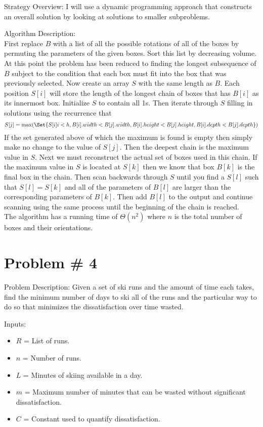 \documentclass{article}
\providecommand\given{} %
\begin{document}
Strategy Overview:
I will use a dynamic programming approach that constructs an overall solution by looking at solutions to smaller subproblems.

Algorithm Description:\\
First replace $B$ with a list of all the possible rotations of all of the boxes by permuting the parameters of the given boxes. Sort this list by decreasing volume. At this point the problem has been reduced to finding the longest subsequence of $B$ subject to the condition that each box must fit into the box that was previously selected. Now create an array $S$ with the same length as $B$. Each position $S[i]$ will store the length of the longest chain of boxes that has $B[i]$ as its innermost box. Initialize $S$ to contain all 1s. Then iterate through $S$ filling in solutions using the recurrence that
$$S[j] =   \max(\Set{S[i] \given i<h, B[i].width < B[j].width, B[i].height < B[j].height, B[i].depth < B[j].depth})$$
If the set generated above of which the maximum is found is empty then simply make no change to the value of $S[j]$. Then the deepest chain is the maximum value in $S$. Next we must reconstruct the actual set of boxes used in this chain. If the maximum value in $S$ is located at $S[k]$ then we know that box $B[k]$ is the final box in the chain. Then scan backwards through $S$ until you find a $S[l]$ such that $S[l] = S[k]$ and all of the parameters of $B[l]$ are larger than the corresponding parameters of $B[k]$. Then add $B[l]$ to the output and continue scanning using the same process until the beginning of the chain is reached.\\

The algorithm has a running time of $\Theta(n^2)$ where $n$ is the total number of boxes and their orientations.

\section*{Problem \# 4}
Problem Description: Given a set of ski runs and the amount of time each takes, find the minimum number of days to ski all of the runs and the particular way to do so that minimizes the dissatisfaction over time wasted.

Inputs:
\begin{itemize}
    \item $R$ = List of runs.
    \item $n$ = Number of runs.
    \item $L$ = Minutes of skiing available in a day.
    \item $m$ = Maximum number of minutes that can be wasted without significant dissatisfaction.
    \item $C$ = Constant used to quantify dissatisfaction. 
\end{itemize}
\end{document}
